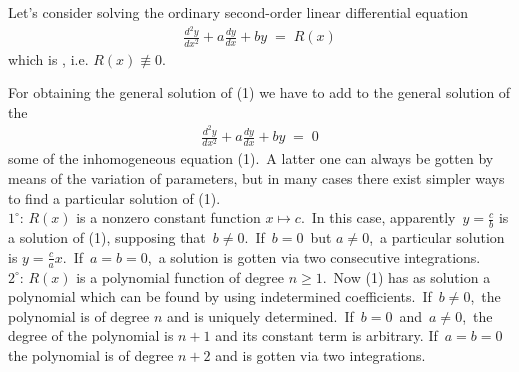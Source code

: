 \documentclass[12pt]{article}
\begin{document}
Let's consider solving the ordinary second-order linear 
differential equation
\begin{align}
      \frac{d^2y}{dx^2}+a\frac{dy}{dx}+by \;=\; R(x)
\end{align}
which is 
, i.e.
$R(x) \not\equiv 0$.

For obtaining the general solution of (1) we have to add to the 
general solution of the 
\begin{align}
\frac{d^2y}{dx^2}+a\frac{dy}{dx}+by \;=\; 0
\end{align}
some 
of the inhomogeneous equation (1).\, A latter one can 
always be gotten by means of the variation of parameters, but 
in many cases there exist simpler ways to find a particular 
solution of (1).\\

\textbf{$1^\circ$}\!:\; $R(x)$ is a nonzero constant function 
$x \mapsto c$.\, In this case, apparently\, $y = \frac{c}{b}$ is 
a solution of (1), supposing that\, $b \neq 0$.\, If\, $b = 0$\, 
but $a \neq 0$,\, a particular solution is $y = \frac{c}{a}x$.\, 
If\, $a = b = 0$,\, a solution is gotten via two consecutive 
integrations.\\

\textbf{$2^\circ$}\!:\; $R(x)$ is a polynomial function of degree 
$n \ge 1$.\, Now (1) has as solution a polynomial which can be 
found by using indetermined coefficients.\, If\, $b \neq 0$,\, 
the polynomial is of degree $n$ and is uniquely determined.\, 
If\, $b = 0$\, and\, $a \neq 0$,\, the degree of the polynomial 
is $n\!+\!1$ and its constant term is arbitrary. If\, 
$a = b = 0$\, the polynomial is of degree $n\!+\!2$ and is 
gotten via two integrations.\\
\end{document}
